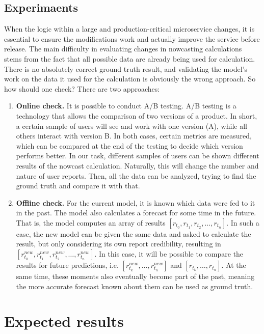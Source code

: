 \documentclass[conference]{IEEEtran}
\begin{document}
\subsection{Experimaents}

When the logic within a large and production-critical microservice changes, it is essential to ensure the modifications work and actually improve the service before release. The main difficulty in evaluating changes in nowcasting calculations stems from the fact that all possible data are already being used for calculation. There is no absolutely correct ground truth result, and validating the model's work on the data it used for the calculation is obviously the wrong approach. So how should one check? There are two approaches:
\begin{enumerate}
	\item \textbf{Online check.} It is possible to conduct A/B testing. A/B testing is a technology that allows the comparison of two versions of a product. In short, a certain sample of users will see and work with one version (A), while all others interact with version B. In both cases, certain metrics are measured, which can be compared at the end of the testing to decide which version performs better. In our task, different samples of users can be shown different results of the nowcast calculation. Naturally, this will change the number and nature of user reports. Then, all the data can be analyzed, trying to find the ground truth and compare it with that.
	\item \textbf{Offline check.} For the current model, it is known which data were fed to it in the past. The model also calculates a forecast for some time in the future. That is, the model computes an array of results $[r_{t_0}, r_{t_1}, r_{t_2}, \dots, r_{t_n}]$. In such a case, the new model can be given the same data and asked to calculate the result, but only considering its own report credibility, resulting in $[r^{new}_{t_0}, r^{new}_{t_1}, r^{new}_{t_2}, \dots, r^{new}_{t_n}]$. In this case, it will be possible to compare the results for future predictions, i.e. $[r^{new}_{t_k}, \dots, r^{new}_{t_n}]$ and $[r_{t_k}, \dots, r_{t_n}]$. At the same time, these moments also eventually become part of the past, meaning the more accurate forecast known about them can be used as ground truth.
\end{enumerate}

\section{Expected results}
\end{document}
